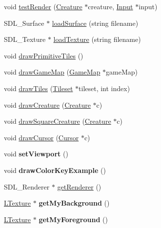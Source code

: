 \begin{DoxyCompactItemize}
\item 
void \hyperlink{class_graphics_afe1bbdee236b1dd96f98fdeda77cf88d}{test\+Render} (\hyperlink{class_creature}{Creature} $\ast$creature, \hyperlink{class_input}{Input} $\ast$input)
\item 
S\+D\+L\+\_\+\+Surface $\ast$ \hyperlink{class_graphics_a279878ad3f1a747e441f2c0e20f2bbab}{load\+Surface} (string filename)
\item 
S\+D\+L\+\_\+\+Texture $\ast$ \hyperlink{class_graphics_ad5f0b6c1b3fd9fac4db77c6e23f2f66e}{load\+Texture} (string filename)
\item 
void \hyperlink{class_graphics_a8d914c5e696214717c1d3d38db207494}{draw\+Primitive\+Tiles} ()
\item 
void \hyperlink{class_graphics_abf80c5d5caf22091133ba90fdda8459c}{draw\+Game\+Map} (\hyperlink{class_game_map}{Game\+Map} $\ast$game\+Map)
\item 
void \hyperlink{class_graphics_a37efcea2a9b2e9e139eebada719b1c59}{draw\+Tiles} (\hyperlink{class_tileset}{Tileset} $\ast$tileset, int index)
\item 
void \hyperlink{class_graphics_a1fd0f0f6b23a6e793a04d11e2736d8e2}{draw\+Creature} (\hyperlink{class_creature}{Creature} $\ast$c)
\item 
void \hyperlink{class_graphics_a874d7a083168bb630df655e234a6a200}{draw\+Square\+Creature} (\hyperlink{class_creature}{Creature} $\ast$c)
\item 
void \hyperlink{class_graphics_a149b8bb3cb3fcf4f67a1a0187af6cbcb}{draw\+Cursor} (\hyperlink{class_cursor}{Cursor} $\ast$c)
\item 
\hypertarget{class_graphics_a1924b4274ef7d57f6e1572f189760e2c}{}void {\bfseries set\+Viewport} ()\label{class_graphics_a1924b4274ef7d57f6e1572f189760e2c}

\item 
\hypertarget{class_graphics_a44e1645c6b51f59539bcb39c79d822d8}{}void {\bfseries draw\+Color\+Key\+Example} ()\label{class_graphics_a44e1645c6b51f59539bcb39c79d822d8}

\item 
S\+D\+L\+\_\+\+Renderer $\ast$ \hyperlink{class_graphics_afacc722603c661f667d0fcfd43f7ab5c}{get\+Renderer} ()
\item 
\hypertarget{class_graphics_aa8d99f1aa702fecc352a0ea63f632cf8}{}\hyperlink{class_l_texture}{L\+Texture} $\ast$ {\bfseries get\+My\+Background} ()\label{class_graphics_aa8d99f1aa702fecc352a0ea63f632cf8}

\item 
\hypertarget{class_graphics_ab9b5d29e1c381e1a3158c53f22b62235}{}\hyperlink{class_l_texture}{L\+Texture} $\ast$ {\bfseries get\+My\+Foreground} ()\label{class_graphics_ab9b5d29e1c381e1a3158c53f22b62235}

\end{DoxyCompactItemize}


